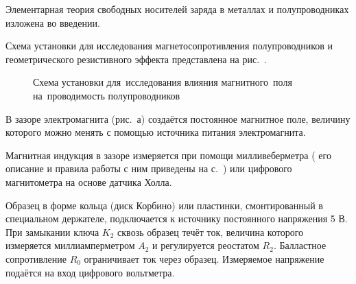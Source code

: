\newpage
{}



Элементарная теория свободных носителей заряда в металлах и полупроводниках изложена во введении.

\experiment Схема установки для исследования магнетосопротивления полупроводников и геометрического резистивного эффекта представлена на рис.~.
\begin{figure}[h!]
	\caption{Схема установки для~исследования влияния магнитного~поля на~проводимость полупроводников}
\end{figure}

В зазоре электромагнита (рис.~а) создаётся постоянное магнитное поле, величину которого можно менять с помощью источника питания электромагнита.

Магнитная индукция в зазоре измеряется при помощи милливеберметра ( его описание и правила работы с ним приведены на с.~\pageref{MWB}) или цифрового магнитометра на основе датчика Холла.

Образец в форме кольца (диск Корбино) или пластинки, смонтированный в специальном держателе, подключается к источнику постоянного напряжения 5 В. При замыкании ключа $K_2$ сквозь образец течёт ток, величина которого измеряется миллиамперметром $A_2$ и регулируется реостатом $R_2$. Балластное сопротивление $R_0$ ограничивает ток через образец. Измеряемое напряжение подаётся на вход цифрового вольтметра.

